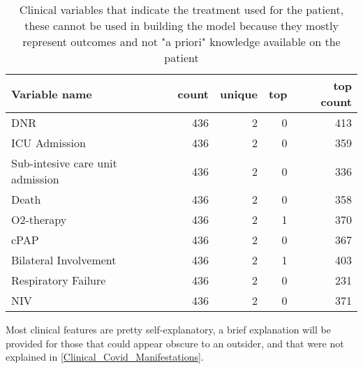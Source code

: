 \begin{table}[htbp]
\caption{Clinical variables that indicate the treatment used for the patient, these cannot be used in building the model because they mostly represent outcomes and not "a priori" knowledge available on the patient \label{tab:ClinicalLabels}}
\centering
\begin{tabular}{lrrrr}
\toprule
Variable name &  count &  unique &  top &  top count \\
\midrule
DNR                              &    436 &       2 &    0 &   413 \\
ICU Admission                    &    436 &       2 &    0 &   359 \\
Sub-intesive care unit admission &    436 &       2 &    0 &   336 \\
Death                            &    436 &       2 &    0 &   358 \\
O2-therapy                       &    436 &       2 &    1 &   370 \\
cPAP                             &    436 &       2 &    0 &   367 \\
Bilateral Involvement            &    436 &       2 &    1 &   403 \\
Respiratory Failure              &    436 &       2 &    0 &   231 \\
NIV                              &    436 &       2 &    0 &   371 \\
\bottomrule
\end{tabular}
\end{table}



Most clinical features are pretty self-explanatory, a brief explanation will be provided for those that could appear obscure to an outsider, and that were not explained in \ref{Clinical_Covid_Manifestations}.

